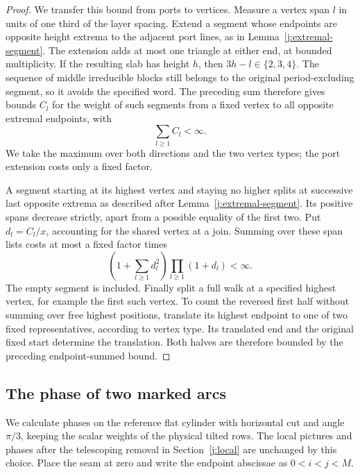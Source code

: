 \begin{proof}
We transfer this bound from ports to vertices. Measure a vertex
span $l$ in units of one third of the layer spacing. Extend a
segment whose endpoints are opposite height extrema to the adjacent
port lines, as in Lemma~\ref{j:extremal-segment}. The extension
adds at most one triangle at either end, at bounded multiplicity.
If the resulting slab has height $h$, then
$3h-l\in\{2,3,4\}$. The sequence of middle irreducible blocks
still belongs to the original period-excluding segment, so it
avoids the specified word. The preceding sum therefore gives
bounds $C_l$ for the weight of such segments from a fixed vertex to
all opposite extremal endpoints, with
\[
 \sum_{l\ge1}C_l<\infty.
\]
We take the maximum over both directions and the two vertex types;
the port extension costs only a fixed factor.

A segment starting at its highest vertex and staying no higher
splits at successive last opposite extrema as described after
Lemma~\ref{j:extremal-segment}. Its positive spans decrease
strictly, apart from a possible equality of the first two. Put
$d_l=C_l/x$, accounting for the shared vertex at a join. Summing
over these span lists costs at most a fixed factor times
\[
 \left(1+\sum_{l\ge1}d_l^2\right)
 \prod_{l\ge1}(1+d_l)<\infty.
\]
The empty segment is included. Finally split a full walk at a
specified highest vertex, for example the first such vertex. To
count the reversed first half without summing over free highest
positions, translate its highest endpoint to one of two fixed
representatives, according to vertex type. Its translated end and
the original fixed start determine the translation. Both halves
are therefore bounded by the preceding endpoint-summed bound.
\end{proof}

\subsection{The phase of two marked arcs}

We calculate phases on the reference flat cylinder with horizontal
cut and angle $\pi/3$, keeping the scalar weights of the physical
tilted rows. The local pictures and phases after the telescoping
removal in Section~\ref{j:local} are unchanged by this choice.
Place the seam at zero and write the endpoint abscissae as
$0<i<j<M$.

